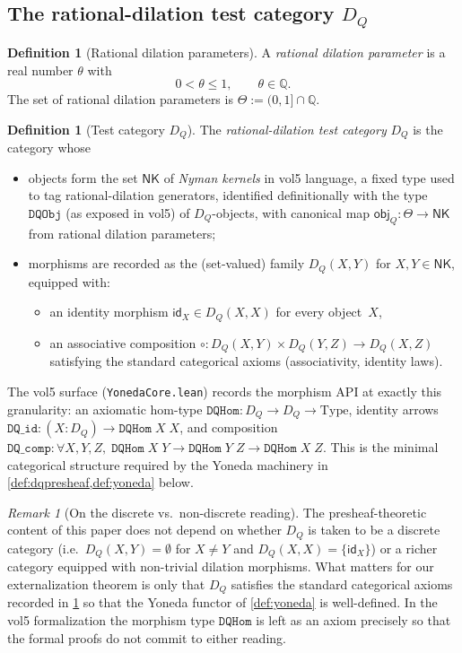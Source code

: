 \documentclass[12pt]{article}
\theoremstyle{plain}
\theoremstyle{definition}
\newtheorem{definition}[theorem]{Definition}
\theoremstyle{remark}
\newtheorem{remark}[theorem]{Remark}
\newcommand{\Rationals}{\mathbb{Q}}
\newcommand{\DQ}{D_{Q}}
\newcommand{\NK}{\mathsf{NK}}
\newcommand{\objQ}{\mathsf{obj}_{Q}}
\begin{document}
\subsection{The rational-dilation test category $\DQ$}

\begin{definition}[Rational dilation parameters]
\label{def:rdp}
A \emph{rational dilation parameter} is a real number $\theta$ with
\[
  0 < \theta \le 1,\qquad \theta\in\Rationals.
\]
The set of rational dilation parameters is
$\Theta := (0,1]\cap\Rationals$.
\end{definition}

\begin{definition}[Test category $\DQ$]
\label{def:DQ}
The \emph{rational-dilation test category} $\DQ$ is the category whose
\begin{itemize}
  \item objects form the set $\NK$ of \emph{Nyman kernels} in vol5
    language, a fixed type used to tag rational-dilation
    generators, identified definitionally with the type
    $\texttt{DQObj}$ (as exposed in vol5) of $\DQ$-objects, with
    canonical map $\objQ\colon \Theta\to\NK$ from rational dilation
    parameters;
  \item morphisms are recorded as the (set-valued) family
    $\DQ(X,Y)$ for $X,Y\in\NK$, equipped with:
    \begin{itemize}
      \item an identity morphism $\mathsf{id}_X\in\DQ(X,X)$ for every
        object~$X$,
      \item an associative composition $\circ\colon \DQ(X,Y)\times
        \DQ(Y,Z)\to\DQ(X,Z)$ satisfying the standard categorical
        axioms (associativity, identity laws).
    \end{itemize}
\end{itemize}
The vol5 surface (\texttt{YonedaCore.lean}) records the morphism API at
exactly this granularity: an axiomatic hom-type
$\texttt{DQHom}\colon \DQ\to\DQ\to\mathrm{Type}$, identity arrows
$\texttt{DQ\_id}\colon (X\colon \DQ)\to\texttt{DQHom}\;X\;X$, and
composition $\texttt{DQ\_comp}\colon \forall X,Y,Z,\;
\texttt{DQHom}\;X\;Y\to\texttt{DQHom}\;Y\;Z\to\texttt{DQHom}\;X\;Z$.
This is the minimal categorical structure required by the Yoneda
machinery in \cref{def:dqpresheaf,def:yoneda} below.
\end{definition}

\begin{remark}[On the discrete vs.\ non-discrete reading]
The presheaf-theoretic content of this paper does not depend on
whether $\DQ$ is taken to be a discrete category (i.e.\
$\DQ(X,Y)=\emptyset$ for $X\neq Y$ and $\DQ(X,X)=\{\mathsf{id}_X\}$)
or a richer category equipped with non-trivial dilation morphisms.
What matters for our externalization theorem is only that $\DQ$
satisfies the standard categorical axioms recorded in
\cref{def:DQ} so that the Yoneda functor of \cref{def:yoneda} is
well-defined.  In the vol5 formalization the morphism type
$\texttt{DQHom}$ is left as an axiom precisely so that the formal
proofs do not commit to either reading.
\end{remark}
\end{document}

